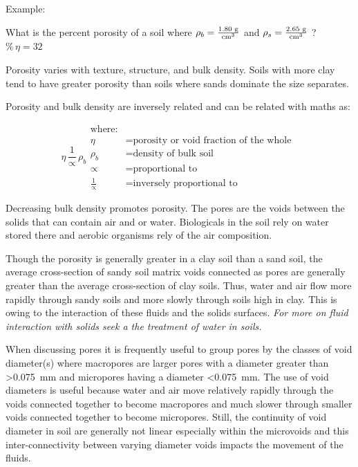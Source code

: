 \documentclass[a5paper]{report}
\begin{document}
Example:

What is the percent porosity of a soil where $\rho_b = \ce{\frac{1.80\,g}{cm^3}}$ and $\rho_s = \ce{\frac{2.65\,g}{cm^3}}$ ? $\%\,\eta = 32$

Porosity varies with texture, structure, and bulk density. Soils with more clay tend to have greater porosity than soils where sands dominate the size separates.

Porosity and bulk density are inversely related and can be related with maths as:

\begin{equation}
    \eta \, \frac{1}{\propto} \, \rho_b
    \begin{aligned}
        \text{where:}\\
        \eta &= \text{porosity or void fraction of the whole }\\
        \rho_b &= \text{density of bulk soil}\\
        \propto &= \text{proportional to}\\
        \frac{1}{\propto} &= \text{inversely proportional to}
    \end{aligned}
\end{equation}

Decreasing bulk density promotes porosity. The pores are the voids between the solids that can contain air and or water. Biologicals in the soil rely on water stored there and aerobic organisms rely of the air composition.

Though the porosity is generally greater in a clay soil than a sand soil, the average cross-section of sandy soil matrix voids connected as pores are generally greater than the average cross-section of clay soils. Thus, water and air flow more rapidly through sandy soils and more slowly through soils high in clay. This is owing to the interaction of these fluids and the solids surfaces. \textit{For more on fluid interaction with solids seek a the treatment of water in soils.}

When discussing pores it is frequently useful to group pores by the classes of void diameter(s) where macropores are larger pores with a diameter greater than \textgreater{}\qty[]{0.075}{\milli\metre} and micropores having a diameter \textless{}\qty[]{0.075}{\milli\metre}. The use of void diameters is useful because water and air move relatively rapidly through the voids connected together to become macropores and much slower through smaller voids connected together to become micropores. Still, the continuity of void diameter in soil are generally not linear especially within the microvoids and this inter-connectivity between varying diameter voids impacts the movement of the fluids.
\end{document}
